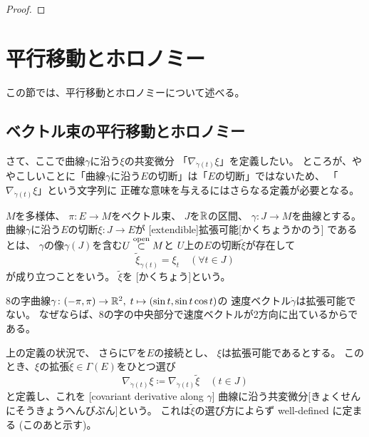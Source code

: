 \documentclass[report]{jlreq}
\begin{document}
\begin{proof}
    \TODO{}
\end{proof}

%
\section{平行移動とホロノミー}

この節では、平行移動とホロノミーについて述べる。

\subsection{ベクトル束の平行移動とホロノミー}

さて、ここで曲線$\gamma$に沿う$\xi$の共変微分
「$\nabla_{\dot{\gamma}(t)} \xi$」を定義したい。
ところが、ややこしいことに「曲線$\gamma$に沿う$E$の切断」は「$E$の切断」ではないため、
「$\nabla_{\dot{\gamma}(t)} \xi$」という文字列に
正確な意味を与えるにはさらなる定義が必要となる。


\begin{definition}[曲線に沿う切断の拡張可能性]
    $M$を多様体、
    $\pi \colon E \to M$をベクトル束、
    $J$を$\mathbb{R}$の区間、
    $\gamma \colon J \to M$を{\smooth}曲線とする。
    曲線$\gamma$に沿う$E$の切断$\xi \colon J \to E$が
    [extendible]{拡張可能}[かくちょうかのう]
    であるとは、
    $\gamma$の像$\gamma(J)$を含む$U \stackrel{\text{open}}{\subset} M$と
    $U$上の$E$の切断$\widetilde{\xi}$が存在して
    \begin{equation}
        \widetilde{\xi}_{\gamma(t)} = \xi_t
            \quad
            (\forall t \in J)
    \end{equation}
    が成り立つことをいう。
    $\widetilde{\xi}$を
    [かくちょう]という。
\end{definition}

\begin{example}[拡張可能でない例]
    8の字曲線$\gamma \colon (-\pi, \pi) \to \mathbb{R}^2, \;
    t \mapsto (\sin t, \sin t \cos t)$の
    速度ベクトル$\dot{\gamma}$は拡張可能でない。
    なぜならば、8の字の中央部分で速度ベクトルが2方向に出ているからである。
\end{example}

\begin{definition}[曲線に沿う共変微分]
    上の定義の状況で、
    さらに$\nabla$を$E$の接続とし、
    $\xi$は拡張可能であるとする。
    このとき、$\xi$の拡張$\widetilde{\xi} \in \Gamma(E)$をひとつ選び
    \begin{equation}
        \nabla_{\dot{\gamma}(t)} \xi
            \coloneqq \nabla_{\dot{\gamma}(t)} \widetilde{\xi}
            \quad
            (t \in J)
    \end{equation}
    と定義し、これを
    [covariant derivative along $\gamma$]
    {曲線に沿う共変微分}[きょくせんにそうきょうへんびぶん]という。
    これは$\widetilde{\xi}$の選び方によらず well-defined に定まる (このあと示す)。
\end{definition}
\end{document}

